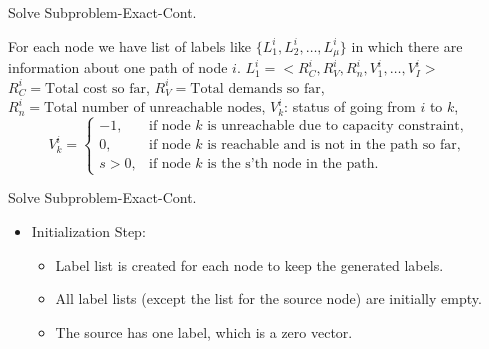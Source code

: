 \documentclass[xcolor=dvipsnames, mathserif, 10pt]{beamer}
\begin{document}
\begin{frame}{Solve Subproblem-Exact-Cont.}

For each node we have list of labels like
$\{L_1^i, L_2^i, \hdots, L_\mu^i\}$ in which there are information about one path of node $i$.
$L_1^i = <R_C^i, R_V^i, R_n^i, V_1^i,\hdots,V_I^i>$
$R_C^i = \text{Total cost so far}$,
$R_V^i = \text{Total demands so far}$,
$R_n^i = \text{Total number of unreachable nodes}$,
$V_k^i$: status of going from $i$ to $k$,
\begin{equation*}
  V_k^i=\begin{cases}
    -1, & \text{if node $k$ is unreachable due to capacity constraint},\\
    0, & \text{if node $k$ is reachable and is not in the path so far},\\
    s>0, & \text{if node $k$ is the s'th node in the path.}
  \end{cases}
\end{equation*}

\end{frame}


\begin{frame}{Solve Subproblem-Exact-Cont.}
\begin{itemize}
    \item Initialization Step:
    \begin{itemize}
        \item Label list is created for each node to keep the generated labels.
        \item All label lists (except the list for the source node) are initially empty.
        \item The source has one label, which is a zero vector.
    \end{itemize}
   
\end{itemize}

\end{frame}
\end{document}
